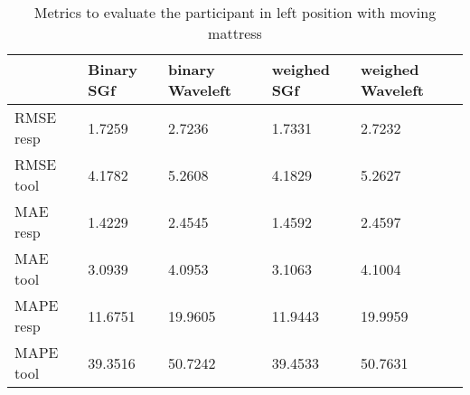 \begin{table}

\begin{tabular}{|lllll|}
\hline 
& Binary SGf & binary Waveleft & weighed  SGf & weighed Waveleft \\ 

\hline 
RMSE resp &
      1.7259  &  2.7236  &  1.7331   & 2.7232 \\
RMSE  tool &   4.1782  &  5.2608  &  4.1829   & 5.2627 \\
MAE resp & 1.4229 &   2.4545 &     1.4592 &  2.4597 \\ 
MAE tool &     3.0939 & 4.0953 & 3.1063 &  4.1004 \\
MAPE resp & 11.6751 & 19.9605 & 11.9443 & 19.9959 \\ 
MAPE tool & 39.3516 & 50.7242 & 39.4533 & 50.7631 \\ 
\hline 
\end{tabular}

\caption{Metrics to evaluate the participant in left position with moving mattress}
\end{table}

